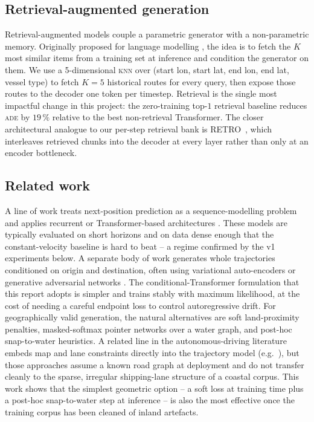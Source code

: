 \documentclass[oneside, a4paper, onecolumn, 11pt]{article}
\newcommand{\ade}{\textsc{ade}}
\newcommand{\knn}{\textsc{knn}}
\begin{document}
\subsection{Retrieval-augmented generation}

Retrieval-augmented models couple a parametric generator with a
non-parametric memory.  Originally proposed for language modelling
\cite{khandelwal2020nearest,lewis2020retrieval}, the idea is to fetch
the $K$ most similar items from a training set at inference and
condition the generator on them.
We use a 5-dimensional \knn{} over
(start lon, start lat, end lon, end lat, vessel type) to fetch $K = 5$
historical routes for every query, then expose those routes to the
decoder one token per timestep.
Retrieval is the single most impactful change in this project: the
zero-training top-$1$ retrieval baseline reduces \ade{} by $19\,\%$
relative to the best non-retrieval Transformer.  The closer
architectural analogue to our per-step retrieval bank is
RETRO~\cite{borgeaud2022retro}, which interleaves retrieved chunks
into the decoder at every layer rather than only at an encoder
bottleneck.

\subsection{Related work}\label{sec:related}

A line of work treats next-position prediction as a sequence-modelling
problem and applies recurrent or Transformer-based architectures
\cite{nguyen2020transformer,capobianco2021lstm}.  These models are
typically evaluated on short horizons and on data dense enough that the
constant-velocity baseline is hard to beat -- a regime confirmed by the
v1 experiments below.
A separate body of work generates whole trajectories conditioned on
origin and destination, often using variational auto-encoders
\cite{liang2022generative} or generative adversarial networks
\cite{wang2019tggan}.  The conditional-Transformer formulation that
this report adopts is simpler and trains stably with maximum
likelihood, at the cost of needing a careful endpoint loss to control
autoregressive drift.
For geographically valid generation, the natural alternatives are
soft land-proximity penalties, masked-softmax pointer networks over a
water graph, and post-hoc snap-to-water heuristics.  A related line in
the autonomous-driving literature embeds map and lane constraints
directly into the trajectory model
(e.g.~\cite{salzmann2020trajectronpp}), but those approaches assume a
known road graph at deployment and do not transfer cleanly to the
sparse, irregular shipping-lane structure of a coastal corpus.
This work shows that the simplest geometric option -- a soft loss at
training time plus a post-hoc snap-to-water step at inference -- is
also the most effective once the training corpus has been cleaned of
inland artefacts.
\end{document}
